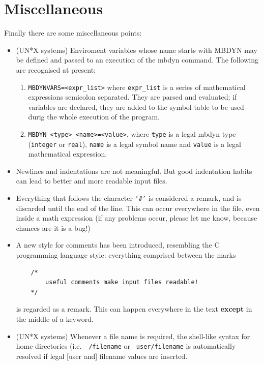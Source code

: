 \documentclass[10pt,dvips]{report}
\begin{document}
\section{Miscellaneous}
Finally there are some miscellaneous points:
\begin{itemize}
    \item (UN*X systems) Enviroment variables whose name starts with MBDYN may
    be defined and passed to an execution of the mbdyn command.
    The following are recognised at present:
  
    \begin{enumerate}
  
        \item {\tt MBDYNVARS=<expr\_list>}
	where {\tt expr\_list} is a series of mathematical expressions
	semicolon separated. 
	They are parsed and evaluated; if variables are declared, they are
	added to the symbol table to be used durig the whole execution of the
	program.
    
        \item {\tt MBDYN\_<type>\_<name>=<value>},
	where {\tt type} is a legal mbdyn type ({\tt integer} or {\tt real}),
	{\tt name} is a legal symbol name and {\tt value} is a legal
	mathematical expression.
    
    \end{enumerate}
    
    \item Newlines and indentations are not meaningful. But good indentation
    habits can lead to better and more readable input files.
    
    \item Everything that follows the character {\tt `\#'} is considered a
    remark, and is discarded until the end of the line. 
    This can occur everywhere in the file, even inside a math expression 
    (if any problems occur, please let me know, because chances are 
    it is a bug!)
    
    \item A new style for comments has been introduced, resembling the 
    C programming language style: everything comprised between the marks 
    \begin{verbatim}
    /*
        useful comments make input files readable!
    */
    \end{verbatim}
    is regarded as a remark. 
    This can happen everywhere in the text {\bf except} in the middle 
    of a keyword.
    
    \item (UN*X systems) Whenever a file name is required, the shell-like
    syntax for home directories (i.e.\ {\tt ~/filename}
    or {\tt ~user/filename} is automatically resolved if legal [user and]
    filename values are inserted.
    
\end{itemize}  
  
\end{document}
